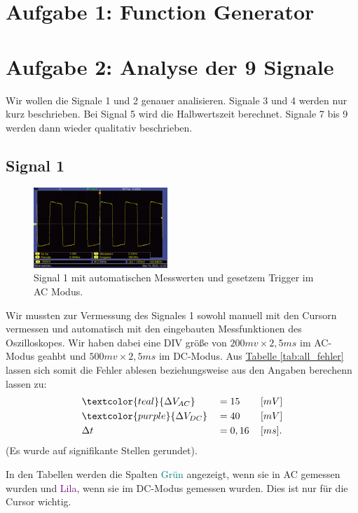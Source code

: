 \twocolumn

\section{Aufgabe 1: Function Generator}

\section{Aufgabe 2: Analyse der 9 Signale}

Wir wollen die Signale 1 und 2 genauer analisieren. Signale 3 und 4 werden nur kurz beschrieben. Bei Signal 5 wird die Halbwertszeit berechnet. Signale 7 bis 9 werden dann wieder qualitativ beschrieben.
\subsection*{Signal 1}
\begin{figure} [h!]
    \centering
        \includegraphics[width=0.45\textwidth]{img/25/Signale2/Signal1-Messwerte.pdf}
    \caption{Signal 1 mit automatischen Messwerten und gesetzem Trigger im AC Modus.}
\end{figure}
Wir mussten zur Vermessung des Signales 1 sowohl manuell mit den Cursorn vermessen und automatisch mit den eingebauten Messfunktionen des Oszilloskopes.
Wir haben dabei eine DIV größe von $200mv \times 2,5ms$ im AC-Modus geahbt und $500mv \times 2,5ms$ im DC-Modus. Aus \hyperref[tab:all_fehler]{Tabelle \ref*{tab:all_fehler}} lassen sich somit die Fehler ablesen beziehungsweise aus den Angaben berechenn lassen zu:
\begin{align}
    &\textcolor{teal}{\Delta V_{AC}} &&= 15\, &&[mV] \\
    &\textcolor{purple}{\Delta V_{DC}} &&= 40\, &&[mV] \\
    &\Delta t &&= 0,16 \, &&[ms].
\end{align}
(Es wurde auf signifikante Stellen gerundet).

In den Tabellen werden die Spalten \textcolor{teal}{Grün} angezeigt, wenn sie in AC gemessen wurden und \textcolor{purple}{Lila}, wenn sie im DC-Modus gemessen wurden. Dies ist nur für die Cursor wichtig.

